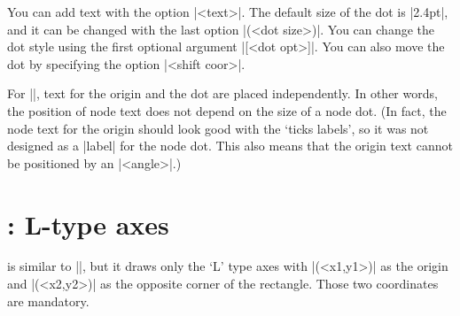 \begin{tzcode}{.3}
{}
\end{tzcode}

You can add text with the option |{<text>}|.
The default size of the dot is |2.4pt|, and it can be changed with the last option |(<dot size>)|. You can change the dot style using the first optional argument |[<dot opt>]|.
You can also move the dot by specifying the option |<shift coor>|.

\begin{tzcode}{.3}
{}
\end{tzcode}

\remark
For |\tzshoworigin*|, text for the origin and the dot are placed independently. In other words, the position of node text does not depend on the size of a node dot.
(In fact, the node text for the origin should look good with the `ticks labels', so it was not designed as a |label| for the node dot. This also means that the origin text cannot be positioned by an |<angle>|.)


\begin{tzcode}{.3}
\end{tzcode}



\section{\protect{}: L-type axes}
\label{s:tzaxesL}

\icmd{\tzaxesL} is similar to |\tzaxes|, but it draws only the `L' type axes with |(<x1,y1>)| as the origin and |(<x2,y2>)| as the opposite corner of the rectangle. 
Those two coordinates are mandatory.

